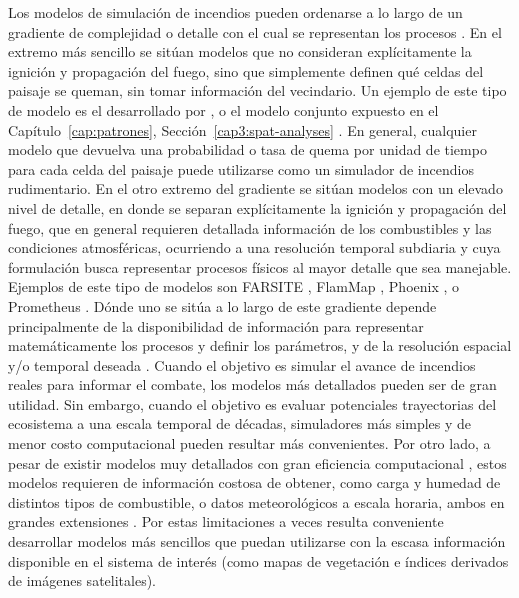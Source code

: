 Los modelos de simulación de incendios pueden ordenarse a lo largo de un gradiente de complejidad o detalle con el cual se representan los procesos \citep{sullivan2009wildland,papadopoulos2011comparative}. En el extremo más sencillo se sitúan modelos que no consideran explícitamente la ignición y propagación del fuego, sino que simplemente definen qué celdas del paisaje se queman, sin tomar información del vecindario. Un ejemplo de este tipo de modelo es el desarrollado por \citet{kitzberger_projections_2022}, o el modelo conjunto expuesto en el Capítulo~\ref{cap:patrones}, Sección~\ref{cap3:spat-analyses} \citep{barbera_patterns}. En general, cualquier modelo que devuelva una probabilidad o tasa de quema por unidad de tiempo para cada celda del paisaje puede utilizarse como un simulador de incendios rudimentario. En el otro extremo del gradiente se sitúan modelos con un elevado nivel de detalle, en donde se separan explícitamente la ignición y propagación del fuego, que en general requieren detallada información de los combustibles y las condiciones atmosféricas, ocurriendo a una resolución temporal subdiaria y cuya formulación busca representar procesos físicos al mayor detalle que sea manejable. Ejemplos de este tipo de modelos son FARSITE \citep{finney1998farsite}, FlamMap \citep{finney2006overview}, Phoenix \citep{tolhurst2008phoenix}, o Prometheus \citep{tymstra2010development}. Dónde uno se sitúa a lo largo de este gradiente depende principalmente de la disponibilidad de información para representar matemáticamente los procesos y definir los parámetros, y de la resolución espacial y/o temporal deseada \citep{sullivan2009wildland,papadopoulos2011comparative}. Cuando el objetivo es simular el avance de incendios reales para informar el combate, los modelos más detallados pueden ser de gran utilidad. Sin embargo, cuando el objetivo es evaluar potenciales trayectorias del ecosistema a una escala temporal de décadas, simuladores más simples y de menor costo computacional pueden resultar más convenientes. Por otro lado, a pesar de existir modelos muy detallados con gran eficiencia computacional \citep{finney2011method}, estos modelos requieren de información costosa de obtener, como carga y humedad de distintos tipos de combustible, o datos meteorológicos a escala horaria, ambos en grandes extensiones \citep{papadopoulos2011comparative}. Por estas limitaciones a veces resulta conveniente desarrollar modelos más sencillos que puedan utilizarse con la escasa información disponible en el sistema de interés (como mapas de vegetación e índices derivados de imágenes satelitales).

